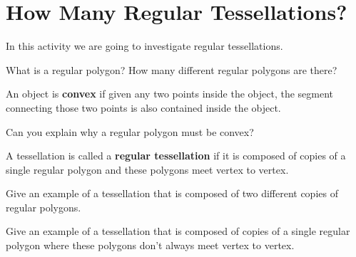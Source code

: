 \newpage
\section{How Many Regular Tessellations?}

In this activity we are going to investigate regular tessellations.

\begin{prob}
What is a regular polygon? How many different regular polygons are
there?
\end{prob}


\begin{dfn} 
An object is \textbf{convex} if given any two points inside the object,
the segment connecting those two points is also contained inside the
object.
\end{dfn}


\begin{prob}
Can you explain why a regular polygon must be convex? 
\end{prob}



\begin{dfn}
A tessellation is called a \textbf{regular tessellation} if it is composed of copies of a single regular polygon and these polygons meet vertex to
vertex.
\end{dfn}

\begin{prob}
Give an example of a tessellation that is composed of two different copies
of regular polygons.
\end{prob}

\begin{prob}
Give an example of a tessellation that is composed of copies of a
single regular polygon where these polygons don't always meet vertex
to vertex.
\end{prob}

